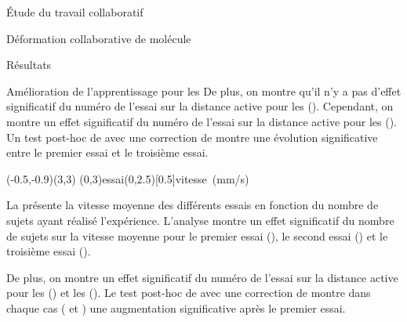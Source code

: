 \documentclass[myfrancais]{mythesis}
\begin{document}
\begin{mypart}{Étude du travail collaboratif}
\begin{mychapter}{Déformation collaborative de molécule}
\begin{mysection}{Résultats}
\begin{mysubsection}{Amélioration de l'apprentissage pour les }
					De plus, on montre qu'il n'y a pas d'effet significatif du numéro de l'essai  sur la distance active  pour les  ().
					Cependant, on montre un effet significatif du numéro de l'essai  sur la distance active  pour les  ().
					Un test post-hoc de  avec une correction de  montre une évolution significative entre le premier essai et le troisième essai.

					\begin{myfigure}
						\begin{myps}(-0.5,-0.9)(3,3)
							\myaxes(0,3){essai}(0,2.5)[0.5]{vitesse~(mm/s)}
						\end{myps}
					\end{myfigure}

					La  présente la vitesse moyenne  des différents essais  en fonction du nombre de sujets  ayant réalisé l'expérience.
					L'analyse montre un effet significatif du nombre de sujets  sur la vitesse moyenne  pour le premier essai (), le second essai () et le troisième essai ().

					De plus, on montre un effet significatif du numéro de l'essai  sur la distance active  pour les  () et les  ().
					Le test post-hoc de  avec une correction de  montre dans chaque cas ( et ) une augmentation significative après le premier essai.


\end{mysubsection}
\end{mysection}
\end{mychapter}
\end{mypart}
\end{document}

